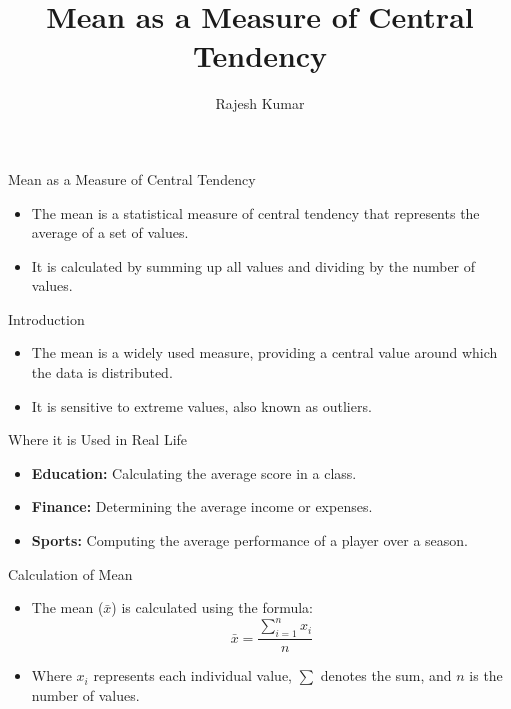 
\title{Mean as a Measure of Central Tendency}
\author{Rajesh Kumar}
\date{}

\begin{frame}
  \titlepage
\end{frame}

\begin{frame}{Mean as a Measure of Central Tendency}
  \begin{itemize}
    \item The mean is a statistical measure of central tendency that represents the average of a set of values.
    \item It is calculated by summing up all values and dividing by the number of values.
  \end{itemize}
\end{frame}

\begin{frame}{Introduction}
  \begin{itemize}
    \item The mean is a widely used measure, providing a central value around which the data is distributed.
    \item It is sensitive to extreme values, also known as outliers.
  \end{itemize}
\end{frame}

\begin{frame}{Where it is Used in Real Life}
  \begin{itemize}
    \item \textbf{Education:} Calculating the average score in a class.
    \item \textbf{Finance:} Determining the average income or expenses.
    \item \textbf{Sports:} Computing the average performance of a player over a season.
  \end{itemize}
\end{frame}

\begin{frame}{Calculation of Mean}
  \begin{itemize}
    \item The mean (\(\bar{x}\)) is calculated using the formula:
    \[ \bar{x} = \frac{\sum_{i=1}^{n} x_i}{n} \]
    \item Where \(x_i\) represents each individual value, \(\sum\) denotes the sum, and \(n\) is the number of values.
  \end{itemize}
\end{frame}

